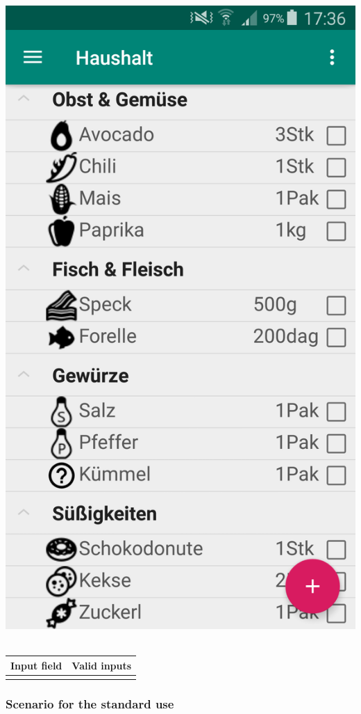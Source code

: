 \documentclass[12pt]{article}
\theoremstyle{definition}
\begin{document}
\includegraphics[scale=0.15]{GUI_Shoppinglist.png}
\\
\\
\begin{tabular}{|l|l|}
\hline
Input field & Valid inputs \\ \hline
 &  \\ \hline
\end{tabular}

\subsubsection{Scenario for the standard use}
\end{document}
